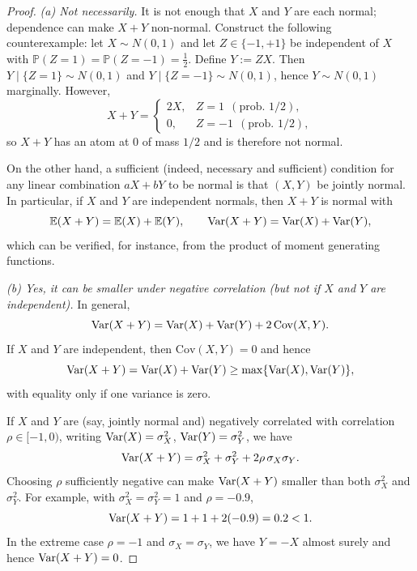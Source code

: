 \documentclass[12pt]{article}
\renewcommand{\(}{\left(}%
\renewcommand{\)}{\right)}%
\renewcommand{\[}{\left[}%
\renewcommand{\]}{\right]}%
\newcommand{\p}{\mathbb{P}}
\newcommand{\var}{{\rm Var}}
\newtheorem{proof}{Proof.}}
\begin{document}
\begin{proof}
\emph{(a) Not necessarily.} 
It is not enough that $X$ and $Y$ are each normal; dependence can make $X+Y$ non-normal.
Construct the following counterexample: let $X\sim N(0,1)$ and let $Z\in\{-1,+1\}$ be independent of $X$ with $\p(Z=1)=\p(Z=-1)=\tfrac12$. Define $Y:=ZX$.
Then $Y\mid\{Z=1\}\sim N(0,1)$ and $Y\mid\{Z=-1\}\sim N(0,1)$, hence $Y\sim N(0,1)$ marginally. However,
\begin{equation*}
X+Y=
\begin{cases}
2X,& Z=1 \ \ (\text{prob. }1/2),\\
0,& Z=-1 \ \ (\text{prob. }1/2),
\end{cases}
\end{equation*}
so $X+Y$ has an atom at $0$ of mass $1/2$ and is therefore not normal. 

On the other hand, a sufficient (indeed, necessary and sufficient) condition for any linear combination $aX+bY$ to be normal is that $(X,Y)$ be jointly normal. In particular, if $X$ and $Y$ are independent normals, then $X+Y$ is normal with
\begin{equation*}
\mathbb E(X+Y)=\mathbb E(X)+\mathbb E(Y), 
\qquad 
\var(X+Y)=\var(X)+\var(Y),
\end{equation*}
which can be verified, for instance, from the product of moment generating functions.

\medskip
\emph{(b) Yes, it can be smaller under negative correlation (but not if $X$ and $Y$ are independent).}
In general,
\begin{equation*}
\var(X+Y)=\var(X)+\var(Y)+2\,\mathrm{Cov}(X,Y).
\end{equation*}
If $X$ and $Y$ are independent, then $\mathrm{Cov}(X,Y)=0$ and hence
\begin{equation*}
\var(X+Y)=\var(X)+\var(Y)\ge \max\{\var(X),\var(Y)\},
\end{equation*}
with equality only if one variance is zero. 

If $X$ and $Y$ are (say, jointly normal and) negatively correlated with correlation $\rho\in[-1,0)$, writing $\var(X)=\sigma_X^2$, $\var(Y)=\sigma_Y^2$, we have
\begin{equation*}
\var(X+Y)=\sigma_X^2+\sigma_Y^2+2\rho\,\sigma_X\sigma_Y.
\end{equation*}
Choosing $\rho$ sufficiently negative can make $\var(X+Y)$ smaller than both $\sigma_X^2$ and $\sigma_Y^2$. For example, with $\sigma_X^2=\sigma_Y^2=1$ and $\rho=-0.9$,
\begin{equation*}
\var(X+Y)=1+1+2(-0.9)=0.2<1.
\end{equation*}
In the extreme case $\rho=-1$ and $\sigma_X=\sigma_Y$, we have $Y=-X$ almost surely and hence $\var(X+Y)=0$.
\end{proof}
\end{document}
